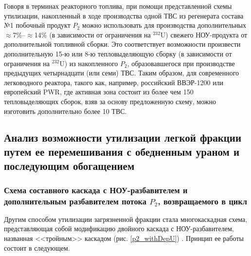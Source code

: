 Говоря в терминах реакторного топлива, при помощи представленной схемы утилизации, накопленный в ходе производства одной ТВС из регенерата  состава №1 побочный продукт $P_2$ можно использовать для производства дополнительных $\approx$7\%--$\approx$14\% (в зависимости от ограничения на $^{232}$U) свежего НОУ-продукта от дополнительной топливной сборки. Это соответствует возможности произвести дополнительную 15-ю или 8-ю тепловыделяющую сборку (в зависимости от ограничения на $^{232}$U) из накопленного $P_2$, образовавшегося при производстве предыдущих четырнадцати (или семи) ТВС. Таким образом, для современного легководного реактора, такого как, например, российский ВВЭР-1200 или европейский PWR, где активная зона состоит из более чем 150 тепловыделяющих сборок, взяв за основу предложенную схему, можно изготовить дополнительно более 10 ТВС. 



\subsection{Анализ возможности утилизации легкой фракции путем ее перемешивания с обедненным ураном и последующим обогащением}

\subsubsection{Схема составного каскада с НОУ-разбавителем и дополнительным разбавителем потока $P_2$, возвращаемого в цикл}

Другим способом утилизации загрязненной фракции стала многокаскадная схема, представляющая собой модификацию двойного каскада с НОУ-разбавителем, названная <<тройным>> каскадом (рис. \ref{p2_withDepU}) \cite{smirnovApplyingEnrichmentCapacities2018}. Принцип ее работы состоит в следующем.

